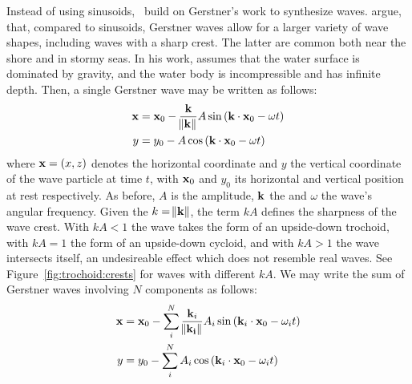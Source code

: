 \textcolor{changed}{Instead of using sinusoids,~\citet{Fournier:1986} build on
Gerstner's work \citep{Gerstner:1809, Rankine:1863} to synthesize waves.
\citeauthor{Fournier:1986} argue, that, compared to sinusoids, Gerstner waves
allow for a larger variety of wave shapes, including waves with a sharp
crest. The latter are common both near the shore and in stormy seas. In his work, \citeauthor{Gerstner:1809} assumes that the water surface is dominated by
gravity, and the water body is incompressible and has infinite depth.
} Then, a single Gerstner wave may be written as follows:
\begin{align}
\mathbf{x} &= \mathbf{x}_0 - \frac{\mathbf{k}}{\norm{\mathbf{k}}} A \sin\left(\mathbf{k}\cdot\mathbf{x}_0-\omega t\right)\\
y &= y_0 - A \cos\left(\mathbf{k}\cdot\mathbf{x}_0-\omega t\right)
\end{align}
where $\mathbf{x}=(x,z)$ denotes the horizontal coordinate and $y$ the
vertical coordinate of the wave particle at time $t$, with $\mathbf{x}_0$ and $y_0$ its horizontal
and vertical position at rest respectively. As before, $A$ is the amplitude,
$\mathbf{k}$ the \wavevector and $\omega$ the wave's angular frequency. Given the
\wavenumber $k=\norm{\mathbf{k}}$, the term $kA$ defines the sharpness of the wave
crest. With $kA<1$ the wave takes the form of an upside-down trochoid, with
$kA=1$ the form of an upside-down cycloid, and with $kA>1$ the wave intersects
itself, an undesireable effect which does not resemble real waves.
See Figure~\ref{fig:trochoid:crests} for waves with different $kA$.
We may write the sum of Gerstner waves involving $N$ components as follows:
\begin{align}
\mathbf{x} &= \mathbf{x}_0 - \sum_i^N\frac{\mathbf{k}_i}{\norm{\mathbf{k_i}}} A_i \sin\left(\mathbf{k}_i\cdot\mathbf{x}_0-\omega_i t\right)\\
y &= y_0 - \sum_i^N A_i \cos\left(\mathbf{k}_i\cdot\mathbf{x}_0-\omega_i t\right)
\end{align}
%

